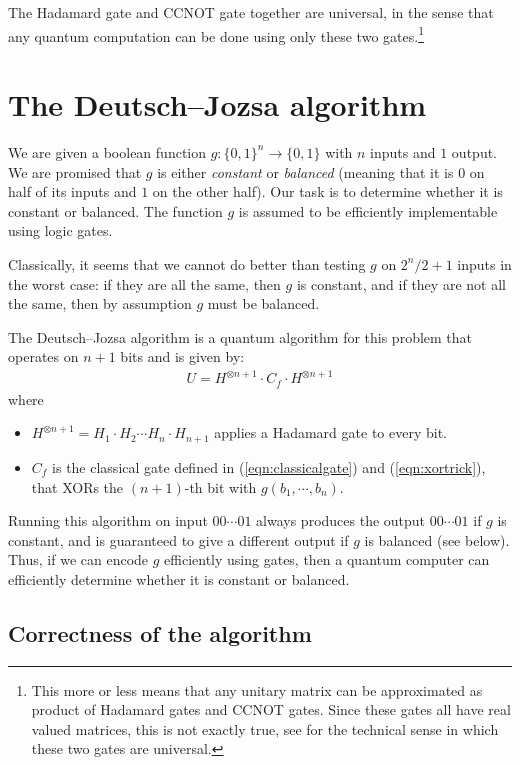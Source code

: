 \documentclass[a4paper, 11pt]{article}
\theoremstyle{definition}
\begin{document}
The Hadamard gate and CCNOT gate together are universal, in the sense that any quantum computation can be done using only these two gates.\footnote{This more or less means that any unitary matrix can be approximated as product of Hadamard gates and CCNOT gates.
Since these gates all have real valued matrices, this is not exactly true, see \cite{aharonovSimpleProofThat2003} for the technical sense in which these two gates are universal.}

\section{The Deutsch–Jozsa algorithm}

We are given a boolean function $g : \{0,1\}^n \to \{0,1\}$ with $n$ inputs and $1$ output.
We are promised that $g$ is either \emph{constant} or \emph{balanced} (meaning that it is $0$ on half of its inputs and $1$ on the other half).
Our task is to determine whether it is constant or balanced.
The function $g$ is assumed to be efficiently implementable using logic gates.

Classically, it seems that we cannot do better than testing $g$ on $2^n/2+ 1$ inputs in the worst case:
if they are all the same, then $g$ is constant, and if they are not all the same, then by assumption $g$ must be balanced.

The Deutsch–Jozsa algorithm \cite{DeutschJozsaAlgorithm2021} is a quantum algorithm for this problem that operates on $n+1$ bits and is given by:
\begin{align*}
  U = H^{\otimes n+1} \cdot C_f \cdot H^{\otimes n+1}
\end{align*}
where
\begin{itemize}
  \item $H^{\otimes n+1} = H_1 \cdot H_2 \cdots H_n \cdot H_{n+1}$ applies a Hadamard gate to every bit.
  \item $C_f$ is the classical gate defined in (\ref{eqn:classicalgate}) and (\ref{eqn:xortrick}), that XORs the $(n+1)$-th bit with $g(b_1,\cdots,b_{n})$.
\end{itemize}

Running this algorithm on input $00\cdots01$ always produces the output $00\cdots01$ if $g$ is constant,
and is guaranteed to give a different output if $g$ is balanced (see below).
Thus, if we can encode $g$ efficiently using gates, then a quantum computer can efficiently determine whether it is constant or balanced.

\subsection{Correctness of the algorithm}
\end{document}
